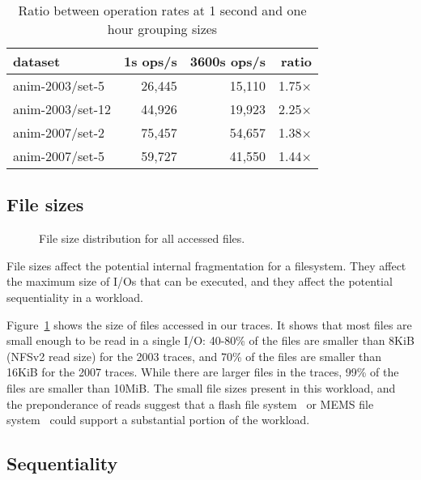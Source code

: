 \begin{table}
\begin{tabular}{|l|r|r|r|}
\hline
dataset & 1s ops/s & 3600s ops/s & ratio \\
\hline
anim-2003/set-5  & 26,445 & 15,110 & 1.75$\times$ \\
anim-2003/set-12 & 44,926 & 19,923 & 2.25$\times$ \\
anim-2007/set-2  & 75,457 & 54,657 & 1.38$\times$ \\
anim-2007/set-5  & 59,727 & 41,550 & 1.44$\times$ \\
\hline
\end{tabular}
\caption{Ratio between operation rates at 1 second and one hour grouping sizes}
\label{table:99quant-differences}
\end{table}

\subsection{File sizes}

\begin{figure}
\caption{File size distribution for all accessed files.}
\label{fig:file-size}
\end{figure}

File sizes affect the potential internal fragmentation for a
filesystem.  They affect the maximum size of I/Os that can be
executed, and they affect the potential sequentiality in a workload.

Figure~\ref{fig:file-size} shows the size of files accessed in our
traces.  It shows that most files are small enough to be read in a single I/O: 
40-80\% of the files are smaller than 8KiB (NFSv2 read size) 
for the 2003 traces, and  70\% of the
files are smaller than 16KiB for the 2007 traces.
While there are larger files in the traces, 99\% of
the files are smaller than 10MiB.  The small file sizes present in this
workload, and the preponderance of reads suggest that a flash file
system~\cite{Kawaguchi95aflash-memory} or MEMS file
system~\cite{SchlosserFast04} could support a substantial portion of
the workload.

\subsection{Sequentiality}

